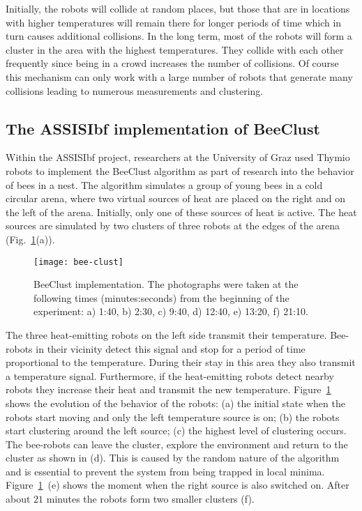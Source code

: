 Initially, the robots will collide at random places, but those that are in locations with higher temperatures will remain there for longer periods of time which in turn causes additional collisions. In the long term, most of the robots will form a cluster in the area with the highest temperatures. They collide with each other frequently since being in a crowd increases the number of collisions. Of course this mechanism can only work with a large number of robots that generate many collisions leading to numerous measurements and clustering. 

\subsection{The ASSISIbf implementation of BeeClust}

Within the ASSISIbf project, researchers at the University of Graz used Thymio robots to implement the BeeClust algorithm as part of research into the behavior of bees in a nest. The algorithm simulates a group of young bees in a cold circular arena, where two virtual sources of heat are placed on the right and on the left of the arena. Initially, only one of these sources of heat is active. The heat sources are simulated by two clusters of three robots at the edges of the arena (Fig.~\ref{fig.beeclust-demo}(a)).

\begin{figure}
\begin{center}
\texttt{[image: bee-clust]}
\end{center}
\caption{BeeClust implementation. The photographs were taken at the following times (minutes:seconds) from the beginning of the experiment: a) 1:40, b) 2:30, c) 9:40, d) 12:40, e) 13:20, f) 21:10.}\label{fig.beeclust-demo}
\end{figure}

The three heat-emitting robots on the left side transmit their temperature. Bee-robots in their vicinity detect this signal and stop for a period of time proportional to the temperature. During their stay in this area they also transmit a temperature signal. Furthermore, if the heat-emitting robots detect nearby robots they increase their heat and transmit the new temperature. Figure~\ref{fig.beeclust-demo} shows the evolution of the behavior of the robots: (a) the initial state when the robots start moving and only the left temperature source is on; (b) the robots start clustering around the left source; (c) the highest level of clustering occurs. The bee-robots can leave the cluster, explore the environment and return to the cluster as shown in (d). This is caused by the random nature of the algorithm and is essential to prevent the system from being trapped in local minima. Figure~\ref{fig.beeclust-demo}~(e) shows the moment when the right source is also switched on. After about $21$ minutes the robots form two smaller clusters (f).

